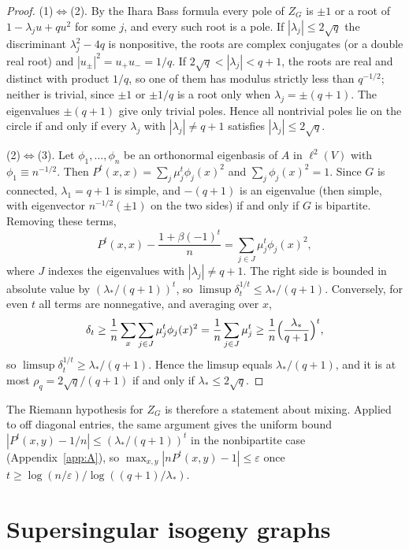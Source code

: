 \begin{proof}
(1)$\Leftrightarrow$(2). By the Ihara Bass formula every pole of $Z_G$ is $\pm1$ or a root of $1-\lambda_ju+qu^2$ for some $j$, and every such root is a pole. If $|\lambda_j|\le2\sqrt q$ the discriminant $\lambda_j^2-4q$ is nonpositive, the roots are complex conjugates (or a double real root) and $|u_\pm|^2=u_+u_-=1/q$. If $2\sqrt q<|\lambda_j|<q+1$, the roots are real and distinct with product $1/q$, so one of them has modulus strictly less than $q^{-1/2}$; neither is trivial, since $\pm1$ or $\pm1/q$ is a root only when $\lambda_j=\pm(q+1)$. The eigenvalues $\pm(q+1)$ give only trivial poles. Hence all nontrivial poles lie on the circle if and only if every $\lambda_j$ with $|\lambda_j|\ne q+1$ satisfies $|\lambda_j|\le2\sqrt q$.

(2)$\Leftrightarrow$(3). Let $\phi_1,\dots,\phi_n$ be an orthonormal eigenbasis of $A$ in $\ell^2(V)$ with $\phi_1\equiv n^{-1/2}$. Then $P^t(x,x)=\sum_j\mu_j^t\phi_j(x)^2$ and $\sum_j\phi_j(x)^2=1$. Since $G$ is connected, $\lambda_1=q+1$ is simple, and $-(q+1)$ is an eigenvalue (then simple, with eigenvector $n^{-1/2}(\pm1)$ on the two sides) if and only if $G$ is bipartite. Removing these terms,
\[
P^t(x,x)-\frac{1+\beta(-1)^t}{n}=\sum_{j\in J}\mu_j^t\phi_j(x)^2,
\]
where $J$ indexes the eigenvalues with $|\lambda_j|\ne q+1$. The right side is bounded in absolute value by $(\lambda_*/(q+1))^t$, so $\limsup\delta_t^{1/t}\le\lambda_*/(q+1)$. Conversely, for even $t$ all terms are nonnegative, and averaging over $x$,
\[
\delta_t\ge\frac1n\sum_x\sum_{j\in J}\mu_j^t\phi_j(x)^2=\frac1n\sum_{j\in J}\mu_j^t\ge\frac1n\Bigl(\frac{\lambda_*}{q+1}\Bigr)^t,
\]
so $\limsup\delta_t^{1/t}\ge\lambda_*/(q+1)$. Hence the limsup equals $\lambda_*/(q+1)$, and it is at most $\rho_q=2\sqrt q/(q+1)$ if and only if $\lambda_*\le2\sqrt q$.
\end{proof}

The Riemann hypothesis for $Z_G$ is therefore a statement about mixing. Applied to off diagonal entries, the same argument gives the uniform bound $|P^t(x,y)-1/n|\le(\lambda_*/(q+1))^t$ in the nonbipartite case (Appendix~\ref{app:A}), so $\max_{x,y}|nP^t(x,y)-1|\le\varepsilon$ once $t\ge\log(n/\varepsilon)/\log((q+1)/\lambda_*)$.

\section{Supersingular isogeny graphs}

